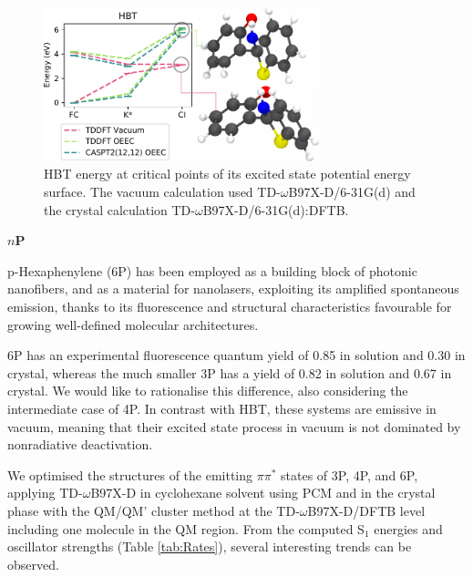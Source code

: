 \begin{figure}
\centering
\includegraphics[width=8cm]{Chapters/7Applications/HBT_energy.pdf}
\caption{HBT energy at critical points of its excited state potential energy surface. The vacuum calculation used TD-$\omega$B97X-D/6-31G(d) and the crystal calculation TD-$\omega$B97X-D/6-31G(d):DFTB.}
\label{fig:hbt_e}
\end{figure}


\textbf{$n$P}

p-Hexaphenylene (6P) has been employed as a building block of photonic nanofibers,\cite{6P_fibers, 6P_fibers2} and as a material for nanolasers,\cite{6P_nanolaser, 6P_nanolaser2} exploiting its amplified spontaneous emission,\cite{6P_ASE} thanks to its fluorescence and structural characteristics favourable for growing well-defined molecular architectures. 

6P has an experimental fluorescence quantum yield of 0.85 in solution and 0.30 in crystal,\cite{6P_qy} whereas the much smaller 3P has a yield of 0.82 in solution\cite{Mukundam} and 0.67 in crystal.\cite{Katoh2009} We would like to rationalise this difference, also considering the intermediate case of 4P. In contrast with HBT, these systems are emissive in vacuum, meaning that their excited state process in vacuum is not dominated by nonradiative deactivation.


We optimised the structures of the emitting $\pi\pi^*$ states of 3P, 4P, and 6P, applying TD-$\omega$B97X-D in cyclohexane solvent using PCM and in the crystal phase with the QM/QM' cluster method at the TD-$\omega$B97X-D/DFTB level including one molecule in the QM region. From the computed S$_1$ energies and oscillator strengths (Table \ref{tab:Rates}), several interesting trends can be observed.


